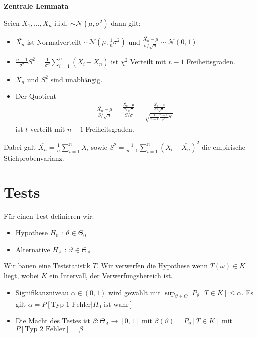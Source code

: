\documentclass[25pt]{sciposter}
\newenvironment{thm}[1]{\begin{mdframed}[backgroundcolor=pink!20,innertopmargin=15pt, innerbottommargin=15pt, nobreak=true]
		\textbf{#1 }
	}
	{ 
	\end{mdframed}
}
\begin{document}
\begin{multicols}{3}
\begin{thm}{Zentrale Lemmata}
	Seien $X_1,\ldots, X_n$ i.i.d. $\sim \mathcal{N}(\mu,\sigma^2)$ dann gilt:
	
	\begin{itemize}
		\item $\overline{X_n}$ ist Normalverteilt $\sim \mathcal{N}(\mu,\frac{1}{n}\sigma^2)$ und $\frac{\overline{X_n} - \mu}{\sigma / \sqrt{n}} \sim \mathcal{N}(0,1)$
		\item $\frac{n-1}{\sigma^2}S^2 = \frac{1}{\sigma^2}\sum_{i=1}^{n}(X_i - \overline{X_n})$ ist $\chi^2$ Verteilt mit $n-1$ Freiheitsgraden.
		\item $\overline{X_n}$ und $S^2$ sind unabhängig.
		\item Der Quotient
		\begin{align*}
\frac{\overline{X_n}-\mu}{S/\sqrt{n}} = \frac{\frac{\overline{X_n} - \mu}{\sigma / \sqrt{n}}}{S/\sigma} = \frac{\frac{\overline{X_n} - \mu}{\sigma / \sqrt{n}}}{\sqrt{\frac{1}{n-1} \frac{n-1}{\sigma^2} S^2}}
		\end{align*}
		ist $t$-verteilt mit $n-1$ Freiheitsgraden.
	\end{itemize}
Dabei galt $\overline{X_n} = \frac{1}{n}\sum_{i=1}^{n} X_i$ sowie $S^2 = \frac{1}{n-1} \sum_{i=1}^{n} (X_i -\overline{X_n})^2$ die empirische Stichprobenvarianz.
\end{thm}

\section{Tests}

Für einen Test definieren wir:
\begin{itemize}
	\item Hypothese $H_0$ : $\vartheta \in \Theta_0$
	\item Alternative $H_A$ : $\vartheta \in \Theta_A$
\end{itemize}

Wir bauen eine Teststatistik $T$. Wir verwerfen die Hypothese wenn $T(\omega) \in K$ liegt, wobei $K$ ein Intervall, der Verwerfungsbereich ist.

\begin{itemize}
	\item Signifikanzniveau $\alpha \in (0,1)$ wird gewählt mit $\sup_{\vartheta\in \Theta_0} P_{\vartheta} \left[T\in K\right] \leq \alpha$. Es gilt $\alpha = P[\text{Typ 1 Fehler} | H_0\text{ ist wahr}]$
	\item Die Macht des Testes ist $\beta : \Theta_A \to [0,1]$ mit $\beta(\vartheta) = P_{\vartheta}[T\in K]$ mit $P[\text{Typ 2 Fehler}] = \beta$
\end{itemize}


\end{multicols}
\end{document}
